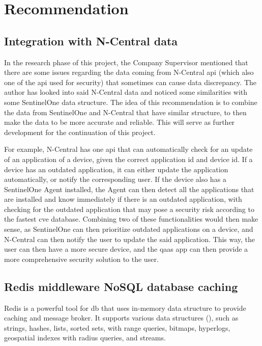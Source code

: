 \section{Recommendation}

\subsection{Integration with N-Central data}

In the research phase of this project, the Company Supervisor mentioned that there are some issues regarding the data coming
from N-Central \acrshort{api} (which also one of the \acrshort{api} used for security) that sometimes can cause data discrepancy. The author
has looked into said N-Central data and noticed some similarities with some SentinelOne data structure. The idea of this recommendation
is to combine the data from SentinelOne and N-Central that have similar structure, to then make the data to be more accurate and reliable.
This will serve as further development for the continuation of this project.

For example, N-Central has one \acrshort{api} that can automatically check for an update of an application
of a device, given the correct application \acrshort{id} and device \acrshort{id}. If a device has an outdated application, it can either
update the application automatically, or notify the corresponding user. If the device also has a SentinelOne Agent installed, the Agent
can then detect all the applications that are installed and know immediately if there is an outdated application, with checking for the
outdated application that may pose a security risk according to the fastest \acrshort{cve} database. Combining two of these functionalities
would then make sense, as SentinelOne can then prioritize outdated applications on a device, and N-Central can then notify the user
to update the said application. This way, the user can then have a more secure device, and the \acrshort{qaas} app can then provide a more
comprehensive security solution to the user.

\subsection{Redis middleware NoSQL database caching}

Redis is a powerful tool for \acrshort{db} that uses in-memory data structure to provide caching and message broker. It supports
various data structures (\textit{\cite{redisDataStructure}}), such as strings, hashes, lists, sorted sets, with range queries,
bitmaps, hyperlogs, geospatial indexes with radius queries, and streams.

